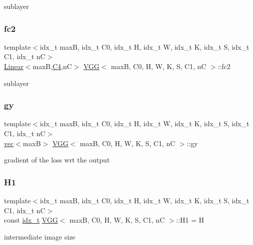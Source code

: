 sublayer \mbox{\label{structVGG_a422a4d5100d100bb361155b1f093ebf7}} 
\subsubsection{\texorpdfstring{fc2}{fc2}}
{\footnotesize\ttfamily template$<$idx\+\_\+t maxB, idx\+\_\+t C0, idx\+\_\+t H, idx\+\_\+t W, idx\+\_\+t K, idx\+\_\+t S, idx\+\_\+t C1, idx\+\_\+t nC$>$ \\
\hyperlink{structLinear}{Linear}$<$maxB,\hyperlink{structVGG_a4d54a1cc3e99340dfb67e7252719c663}{C4},nC$>$ \hyperlink{structVGG}{V\+GG}$<$ maxB, C0, H, W, K, S, C1, nC $>$\+::fc2}

sublayer \mbox{\label{structVGG_a4a45e28a72f469b5b1432ee572627c17}} 
\subsubsection{\texorpdfstring{gy}{gy}}
{\footnotesize\ttfamily template$<$idx\+\_\+t maxB, idx\+\_\+t C0, idx\+\_\+t H, idx\+\_\+t W, idx\+\_\+t K, idx\+\_\+t S, idx\+\_\+t C1, idx\+\_\+t nC$>$ \\
\hyperlink{structvec}{vec}$<$maxB$>$ \hyperlink{structVGG}{V\+GG}$<$ maxB, C0, H, W, K, S, C1, nC $>$\+::gy}

gradient of the loss wrt the output \mbox{\label{structVGG_a73f189c70eef33b8e8de32929db37b10}} 
\subsubsection{\texorpdfstring{H1}{H1}}
{\footnotesize\ttfamily template$<$idx\+\_\+t maxB, idx\+\_\+t C0, idx\+\_\+t H, idx\+\_\+t W, idx\+\_\+t K, idx\+\_\+t S, idx\+\_\+t C1, idx\+\_\+t nC$>$ \\
const \hyperlink{vgg__util_8h_a8e93478a00e685bea5e6a3f617bf03a3}{idx\+\_\+t} \hyperlink{structVGG}{V\+GG}$<$ maxB, C0, H, W, K, S, C1, nC $>$\+::H1 = H\hspace{0.3cm}{\ttfamily [static]}}

intermediate image size \mbox{\label{structVGG_a6658da7d5fd275b2af6eb75511ba6f80}} 
